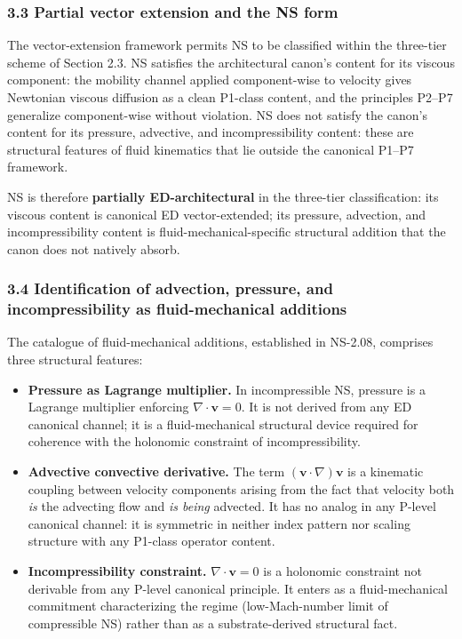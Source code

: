 \documentclass[
  11pt,a4paper]{article}
\begin{document}
\subsubsection{3.3 Partial vector extension and the NS
form}\label{partial-vector-extension-and-the-ns-form}

The vector-extension framework permits NS to be classified within the
three-tier scheme of Section 2.3. NS satisfies the architectural canon's
content for its viscous component: the mobility channel applied
component-wise to velocity gives Newtonian viscous diffusion as a clean
P1-class content, and the principles P2--P7 generalize component-wise
without violation. NS does not satisfy the canon's content for its
pressure, advective, and incompressibility content: these are structural
features of fluid kinematics that lie outside the canonical P1--P7
framework.

NS is therefore \textbf{partially ED-architectural} in the three-tier
classification: its viscous content is canonical ED vector-extended; its
pressure, advection, and incompressibility content is
fluid-mechanical-specific structural addition that the canon does not
natively absorb.

\subsubsection{3.4 Identification of advection, pressure, and
incompressibility as fluid-mechanical
additions}\label{identification-of-advection-pressure-and-incompressibility-as-fluid-mechanical-additions}

The catalogue of fluid-mechanical additions, established in NS-2.08,
comprises three structural features:

\begin{itemize}
\item
  \textbf{Pressure as Lagrange multiplier.} In incompressible NS,
  pressure is a Lagrange multiplier enforcing
  \(\nabla \cdot \mathbf{v} = 0\). It is not derived from any ED
  canonical channel; it is a fluid-mechanical structural device required
  for coherence with the holonomic constraint of incompressibility.
\item
  \textbf{Advective convective derivative.} The term
  \((\mathbf{v} \cdot \nabla)\mathbf{v}\) is a kinematic coupling
  between velocity components arising from the fact that velocity both
  \emph{is} the advecting flow and \emph{is being} advected. It has no
  analog in any P-level canonical channel: it is symmetric in neither
  index pattern nor scaling structure with any P1-class operator
  content.
\item
  \textbf{Incompressibility constraint.} \(\nabla \cdot \mathbf{v} = 0\)
  is a holonomic constraint not derivable from any P-level canonical
  principle. It enters as a fluid-mechanical commitment characterizing
  the regime (low-Mach-number limit of compressible NS) rather than as a
  substrate-derived structural fact.
\end{itemize}
\end{document}
